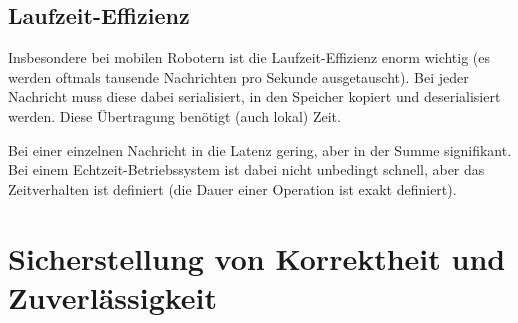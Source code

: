 		\subsection{Laufzeit-Effizienz}
			Insbesondere bei mobilen Robotern ist die Laufzeit-Effizienz enorm wichtig (es werden oftmals tausende Nachrichten pro Sekunde ausgetauscht). Bei jeder Nachricht muss diese dabei serialisiert, in den Speicher kopiert und deserialisiert werden. Diese Übertragung benötigt (auch lokal) Zeit.

			Bei einer einzelnen Nachricht in die Latenz gering, aber in der Summe signifikant. Bei einem Echtzeit-Betriebssystem ist dabei nicht unbedingt schnell, aber das Zeitverhalten ist definiert (\dh die Dauer einer Operation ist exakt definiert).

	\section{Sicherstellung von Korrektheit und Zuverlässigkeit}
